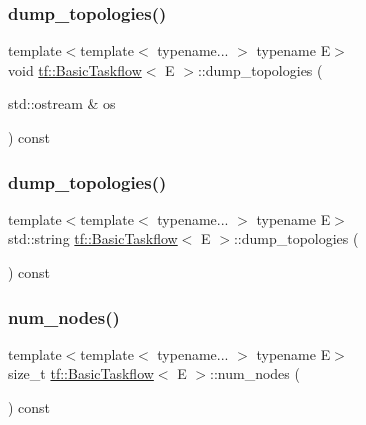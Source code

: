 \mbox{\label{classtf_1_1BasicTaskflow_a6ada71950f0e3384f2ab95814bbc7c3f}} 
\subsubsection{\texorpdfstring{dump\+\_\+topologies()}{dump\_topologies()}\hspace{0.1cm}{\footnotesize\ttfamily [1/2]}}
{\footnotesize\ttfamily template$<$template$<$ typename... $>$ typename E$>$ \\
void \hyperlink{classtf_1_1BasicTaskflow}{tf\+::\+Basic\+Taskflow}$<$ E $>$\+::dump\+\_\+topologies (\begin{DoxyParamCaption}\item[{std\+::ostream \&}]{os }\end{DoxyParamCaption}) const}

\mbox{\label{classtf_1_1BasicTaskflow_ae4c67b7bc87564e8b5b309837f4b6d78}} 
\subsubsection{\texorpdfstring{dump\+\_\+topologies()}{dump\_topologies()}\hspace{0.1cm}{\footnotesize\ttfamily [2/2]}}
{\footnotesize\ttfamily template$<$template$<$ typename... $>$ typename E$>$ \\
std\+::string \hyperlink{classtf_1_1BasicTaskflow}{tf\+::\+Basic\+Taskflow}$<$ E $>$\+::dump\+\_\+topologies (\begin{DoxyParamCaption}{ }\end{DoxyParamCaption}) const}

\mbox{\label{classtf_1_1BasicTaskflow_a18341302575dcb719e455d84a738273f}} 
\subsubsection{\texorpdfstring{num\+\_\+nodes()}{num\_nodes()}}
{\footnotesize\ttfamily template$<$template$<$ typename... $>$ typename E$>$ \\
size\+\_\+t \hyperlink{classtf_1_1BasicTaskflow}{tf\+::\+Basic\+Taskflow}$<$ E $>$\+::num\+\_\+nodes (\begin{DoxyParamCaption}{ }\end{DoxyParamCaption}) const}

